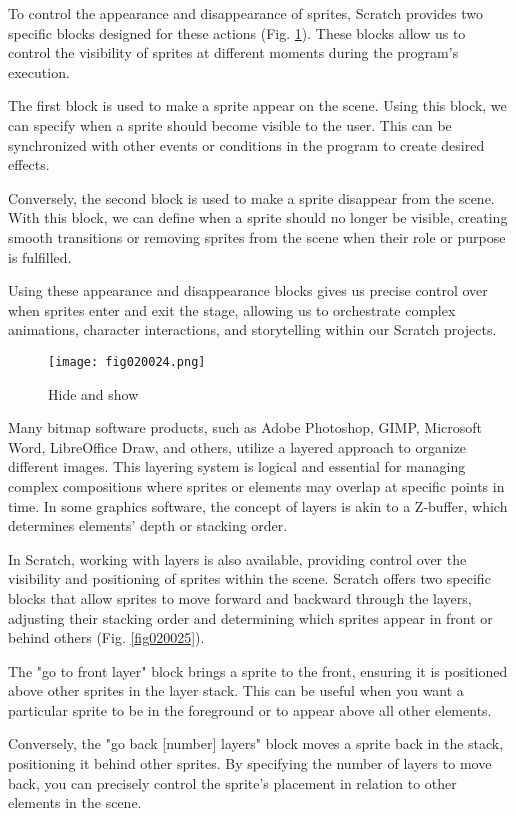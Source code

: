 To control the appearance and disappearance of sprites, Scratch provides two specific blocks designed for these actions (Fig. \ref{fig020024}). These blocks allow us to control the visibility of sprites at different moments during the program's execution.

The first block is used to make a sprite appear on the scene. Using this block, we can specify when a sprite should become visible to the user. This can be synchronized with other events or conditions in the program to create desired effects.

Conversely, the second block is used to make a sprite disappear from the scene. With this block, we can define when a sprite should no longer be visible, creating smooth transitions or removing sprites from the scene when their role or purpose is fulfilled.

Using these appearance and disappearance blocks gives us precise control over when sprites enter and exit the stage, allowing us to orchestrate complex animations, character interactions, and storytelling within our Scratch projects.

\begin{figure}[H]
   \centering
   \texttt{[image: fig020024.png]}
   \caption{Hide and show}
\label{fig020024}
\end{figure}

Many bitmap software products, such as Adobe Photoshop, GIMP, Microsoft Word, LibreOffice Draw, and others, utilize a layered approach to organize different images. This layering system is logical and essential for managing complex compositions where sprites or elements may overlap at specific points in time. In some graphics software, the concept of layers is akin to a Z-buffer, which determines elements' depth or stacking order.

In Scratch, working with layers is also available, providing control over the visibility and positioning of sprites within the scene. Scratch offers two specific blocks that allow sprites to move forward and backward through the layers, adjusting their stacking order and determining which sprites appear in front or behind others (Fig. \ref{fig020025}).

The "go to front layer" block brings a sprite to the front, ensuring it is positioned above other sprites in the layer stack. This can be useful when you want a particular sprite to be in the foreground or to appear above all other elements.

Conversely, the "go back [number] layers" block moves a sprite back in the stack, positioning it behind other sprites. By specifying the number of layers to move back, you can precisely control the sprite's placement in relation to other elements in the scene.

